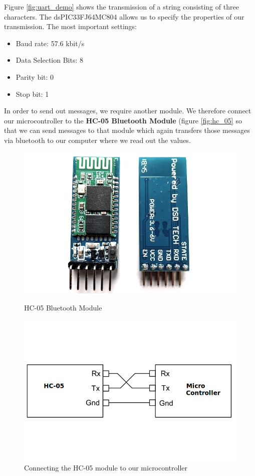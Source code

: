 Figure \ref{fig:uart_demo} shows the transmission of a string consisting of three characters.
The dsPIC33FJ64MC804 allows us to specify the properties of our transmission. The most important settings:
\begin{itemize}
    \item Baud rate: 57.6 kbit/s
    \item Data Selection Bits: 8
    \item Parity bit: 0
    \item Stop bit: 1
\end{itemize}

In order to send out messages, we require another module. We therefore connect our microcontroller to the \textbf{HC-05 Bluetooth Module} (figure \ref{fig:hc_05} so that we can send messages to that module which again transfers those messages via bluetooth to our computer where we read out the values.

\begin{figure}[htb]
    \centering
    \begin{minipage}{.5\textwidth}
          \centering
            \includegraphics[width=.9\linewidth]{figures/software/uart_hc05.jpg}
              \caption{HC-05 Bluetooth Module}
                \label{fig:hc_05}
    \end{minipage}%
    \begin{minipage}{.5\textwidth}
          \centering
            \includegraphics[width=.9\linewidth]{figures/software/uart_plug.png}
              \caption{Connecting the HC-05 module to our microcontroller}
                \label{fig:wire_3}
    \end{minipage}
\end{figure}

